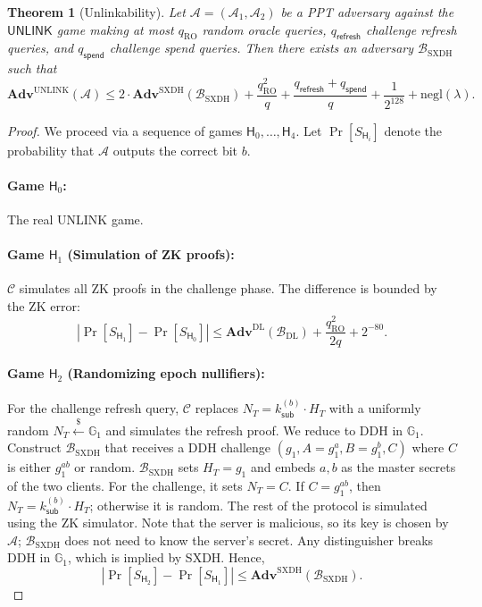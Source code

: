 \documentclass[11pt]{article}
\theoremstyle{definitionstyle}
\newtheorem{theorem}{Theorem}[section]
\theoremstyle{plain}
\newcommand{\advantage}[1]{\mathbf{Adv}^{\mathrm{#1}}}
\newcommand{\negl}{\mathrm{negl}}
\begin{document}
\begin{theorem}[Unlinkability]
Let $\mathcal{A} = (\mathcal{A}_1, \mathcal{A}_2)$ be a PPT adversary against the $\mathsf{UNLINK}$ game making at most $q_{\text{RO}}$ random oracle queries, $q_{\mathsf{refresh}}$ challenge refresh queries, and $q_{\mathsf{spend}}$ challenge spend queries. Then there exists an adversary $\mathcal{B}_{\text{SXDH}}$ such that
\[
\advantage{UNLINK}(\mathcal{A}) \le 2 \cdot \advantage{SXDH}(\mathcal{B}_{\text{SXDH}}) + \frac{q_{\text{RO}}^2}{q} + \frac{q_{\mathsf{refresh}}+q_{\mathsf{spend}}}{q} + \frac{1}{2^{128}} + \negl(\lambda).
\]
\end{theorem}
\begin{proof}
We proceed via a sequence of games $\mathsf{H}_0,\dots,\mathsf{H}_4$. Let $\Pr[S_{\mathsf{H}_i}]$ denote the probability that $\mathcal{A}$ outputs the correct bit $b$.

\paragraph{Game $\mathsf{H}_0$:} The real UNLINK game.

\paragraph{Game $\mathsf{H}_1$ (Simulation of ZK proofs):} $\mathcal{C}$ simulates all ZK proofs in the challenge phase. The difference is bounded by the ZK error:
\[
|\Pr[S_{\mathsf{H}_1}] - \Pr[S_{\mathsf{H}_0}]| \le \advantage{DL}(\mathcal{B}_{\text{DL}}) + \frac{q_{\text{RO}}^2}{2q} + 2^{-80}.
\]

\paragraph{Game $\mathsf{H}_2$ (Randomizing epoch nullifiers):} For the challenge refresh query, $\mathcal{C}$ replaces $N_T = k_{\mathsf{sub}}^{(b)} \cdot H_T$ with a uniformly random $N_T \xleftarrow{\$} \mathbb{G}_1$ and simulates the refresh proof. We reduce to DDH in $\mathbb{G}_1$. Construct $\mathcal{B}_{\text{SXDH}}$ that receives a DDH challenge $(g_1, A = g_1^a, B = g_1^b, C)$ where $C$ is either $g_1^{ab}$ or random. $\mathcal{B}_{\text{SXDH}}$ sets $H_T = g_1$ and embeds $a,b$ as the master secrets of the two clients. For the challenge, it sets $N_T = C$. If $C = g_1^{ab}$, then $N_T = k_{\mathsf{sub}}^{(b)} \cdot H_T$; otherwise it is random. The rest of the protocol is simulated using the ZK simulator. Note that the server is malicious, so its key is chosen by $\mathcal{A}$; $\mathcal{B}_{\text{SXDH}}$ does not need to know the server's secret. Any distinguisher breaks DDH in $\mathbb{G}_1$, which is implied by SXDH. Hence,
\[
|\Pr[S_{\mathsf{H}_2}] - \Pr[S_{\mathsf{H}_1}]| \le \advantage{SXDH}(\mathcal{B}_{\text{SXDH}}).
\]


\end{proof}
\end{document}

